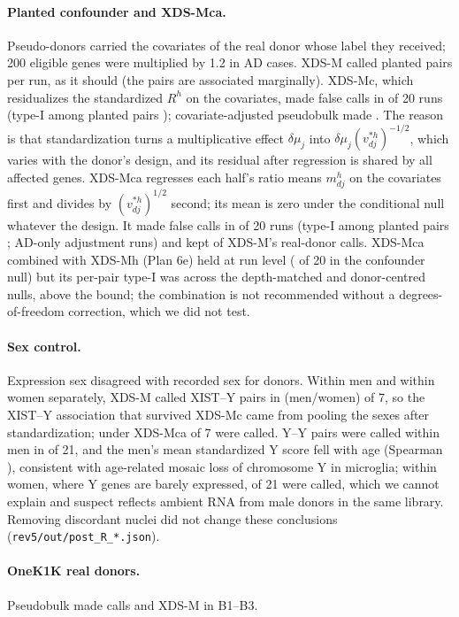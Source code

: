 \paragraph{Planted confounder and XDS-Mca.} Pseudo-donors carried the covariates of the real donor whose label they received; 200 eligible genes were multiplied by 1.2 in AD cases. XDS-M called \CfXplanted{} planted pairs per run, as it should (the pairs are associated marginally). XDS-Mc, which residualizes the standardized $R^h$ on the covariates, made false calls in \CfXcany{} of 20 runs (type-I among planted pairs \CfXctI); covariate-adjusted pseudobulk made \CfPBc. The reason is that standardization turns a multiplicative effect $\delta\mu_j$ into $\delta\mu_j(v^{*h}_{dj})^{-1/2}$, which varies with the donor's design, and its residual after regression is shared by all affected genes. XDS-Mca regresses each half's ratio means $m^h_{dj}$ on the covariates first and divides by $(v^{*h}_{dj})^{1/2}$ second; its mean is zero under the conditional null whatever the design. It made false calls in \CfXcaany{} of 20 runs (type-I among planted pairs \CfXcatI; AD-only adjustment \CfXcaADany{} runs) and kept \CaKeep{} of XDS-M's real-donor calls. XDS-Mca combined with XDS-Mh (Plan 6e) held at run level (\HcCany{} of 20 in the confounder null) but its per-pair type-I was \HcTI{} across the depth-matched and donor-centred nulls, above the bound; the combination is not recommended without a degrees-of-freedom correction, which we did not test.

\paragraph{Sex control.} Expression sex disagreed with recorded sex for \SexMismatch{} donors. Within men and within women separately, XDS-M called XIST--Y pairs in \SexWithinXY{} (men/women) of 7, so the XIST--Y association that survived XDS-Mc came from pooling the sexes after standardization; under XDS-Mca \CaXISTY{} of 7 were called. Y--Y pairs were called within men in \SexWithinMaleYY{} of 21, and the men's mean standardized Y score fell with age (Spearman \SexLOY), consistent with age-related mosaic loss of chromosome Y in microglia; within women, where Y genes are barely expressed, \SexWithinFemaleYY{} of 21 were called, which we cannot explain and suspect reflects ambient RNA from male donors in the same library. Removing discordant nuclei did not change these conclusions (\texttt{rev5/out/post\_R\_*.json}).

\paragraph{OneK1K real donors.} Pseudobulk made \OnekRealPB{} calls and XDS-M \OnekRealX{} in B1--B3.

